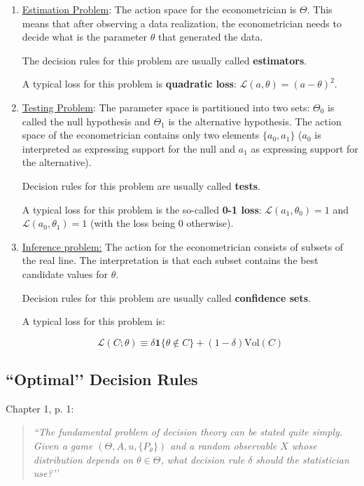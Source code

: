 \documentclass[11pt]{article} %
\begin{document}
\begin{enumerate}
\item \underline{Estimation Problem}: The action space for the econometrician is $\Theta$. This means that after observing a data realization, the econometrician needs to decide what is the parameter $\theta$ that generated the data. 

The decision rules for this problem are usually called \textbf{estimators}.

A typical loss for this problem is \textbf{quadratic loss}: $\mathcal{L}(a,\theta)=(a-\theta)^2$.


\item \underline{Testing Problem}: The parameter space is partitioned into two sets: $\Theta_0$ is called the null hypothesis and $\Theta_1$ is the alternative hypothesis. The action space of the econometrician contains only two elements $\{a_0, a_1\}$ ($a_0$ is interpreted as expressing support for the null and $a_1$ as expressing support for the alternative). 

Decision rules for this problem are usually called \textbf{tests}.

A typical loss for this problem is the so-called \textbf{0-1 loss}: $\mathcal{L}(a_1,\theta_0)=1$ and $\mathcal{L}(a_0,\theta_1)=1$ (with the loss being 0 otherwise).

\item \underline{Inference problem:} The action for the econometrician consists of subsets of the real line. The interpretation is that each subset contains the best candidate values for $\theta$. 

Decision rules for this problem are usually called \textbf{confidence sets}.

A typical loss for this problem is:

\[ \mathcal{L}(C;\theta)\equiv\delta \mathbf{1}\{ \theta \notin C \} + (1-\delta) \textrm{Vol}(C)  \]

\end{enumerate}

\subsection{``Optimal’’ Decision Rules}

\cite{Ferguson67} Chapter 1, p. 1: 

\begin{quote}
\emph{``The fundamental problem of decision theory can be stated quite simply. Given a game $(\Theta,A,u,\{P_{\theta}\})$ and a random observable $X$ whose distribution depends on $\theta \in \Theta$, what decision rule $\delta$ should the statistician use?’’}
\end{quote}
\end{document}
